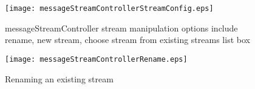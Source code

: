 \begin{figure}[htb]
\centering
\texttt{[image: messageStreamControllerStreamConfig.eps]}
\caption{messageStreamController stream manipulation options include rename, new stream, choose stream from existing streams list box}
\label{fig:MessageStreamControlStreamConfig}
\end{figure}


\begin{figure}[htb]
\centering
\texttt{[image: messageStreamControllerRename.eps]}
\caption{Renaming an existing stream}
\label{fig:MessageStreamControlRename}
\end{figure}

